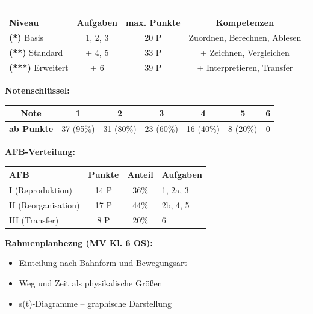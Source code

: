 \documentclass[11pt,a4paper]{article}
\newcommand{\stern}[1]{\textbf{(#1)}}
\begin{document}
\vspace{1em}

\hrule
\vspace{0.5em}

\begin{center}
\renewcommand{\arraystretch}{1.3}
\begin{tabular}{|l|c|c|c|}
\hline
\textbf{Niveau} & \textbf{Aufgaben} & \textbf{max. Punkte} & \textbf{Kompetenzen} \\
\hline
\stern{*} Basis & 1, 2, 3 & 20 P & Zuordnen, Berechnen, Ablesen \\
\hline
\stern{**} Standard & + 4, 5 & 33 P & + Zeichnen, Vergleichen \\
\hline
\stern{***} Erweitert & + 6 & 39 P & + Interpretieren, Transfer \\
\hline
\end{tabular}
\end{center}

\vspace{0.5em}

\noindent\textbf{Notenschlüssel:}

\begin{center}
\small
\begin{tabular}{|c|c|c|c|c|c|c|}
\hline
\textbf{Note} & 1 & 2 & 3 & 4 & 5 & 6 \\
\hline
\textbf{ab Punkte} & 37 (95\%) & 31 (80\%) & 23 (60\%) & 16 (40\%) & 8 (20\%) & 0 \\
\hline
\end{tabular}
\end{center}

\vspace{0.5em}

\noindent\textbf{AFB-Verteilung:}

\begin{center}
\small
\begin{tabular}{|l|c|c|l|}
\hline
\textbf{AFB} & \textbf{Punkte} & \textbf{Anteil} & \textbf{Aufgaben} \\
\hline
I (Reproduktion) & 14 P & 36\% & 1, 2a, 3 \\
\hline
II (Reorganisation) & 17 P & 44\% & 2b, 4, 5 \\
\hline
III (Transfer) & 8 P & 20\% & 6 \\
\hline
\end{tabular}
\end{center}

\vspace{0.5em}

\noindent\textbf{Rahmenplanbezug (MV Kl. 6 OS):}
\begin{itemize}[leftmargin=2em, topsep=2pt, itemsep=0pt]
    \item Einteilung nach Bahnform und Bewegungsart
    \item Weg und Zeit als physikalische Größen
    \item s(t)-Diagramme -- graphische Darstellung
\end{itemize}
\end{document}
